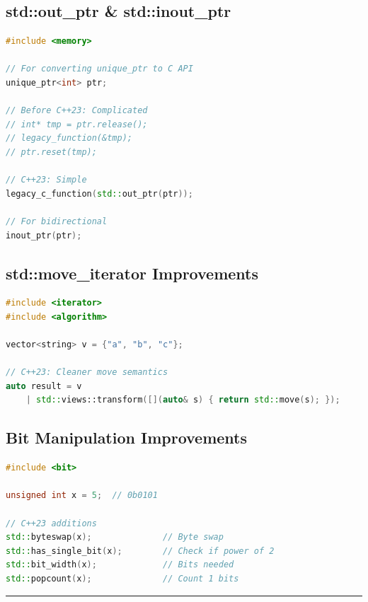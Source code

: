 \hypertarget{stdout_ptr-stdinout_ptr}{%
\subsection{std::out\_ptr \&
std::inout\_ptr}\label{stdout_ptr-stdinout_ptr}}

\begin{lstlisting}[language={C++}]
#include <memory>

// For converting unique_ptr to C API
unique_ptr<int> ptr;

// Before C++23: Complicated
// int* tmp = ptr.release();
// legacy_function(&tmp);
// ptr.reset(tmp);

// C++23: Simple
legacy_c_function(std::out_ptr(ptr));

// For bidirectional
inout_ptr(ptr);
\end{lstlisting}

\hypertarget{stdmove_iterator-improvements}{%
\subsection{std::move\_iterator
Improvements}\label{stdmove_iterator-improvements}}

\begin{lstlisting}[language={C++}]
#include <iterator>
#include <algorithm>

vector<string> v = {"a", "b", "c"};

// C++23: Cleaner move semantics
auto result = v
    | std::views::transform([](auto& s) { return std::move(s); });
\end{lstlisting}

\hypertarget{bit-manipulation-improvements}{%
\subsection{Bit Manipulation
Improvements}\label{bit-manipulation-improvements}}

\begin{lstlisting}[language={C++}]
#include <bit>

unsigned int x = 5;  // 0b0101

// C++23 additions
std::byteswap(x);              // Byte swap
std::has_single_bit(x);        // Check if power of 2
std::bit_width(x);             // Bits needed
std::popcount(x);              // Count 1 bits
\end{lstlisting}

\begin{center}\rule{0.5\linewidth}{0.5pt}\end{center}

